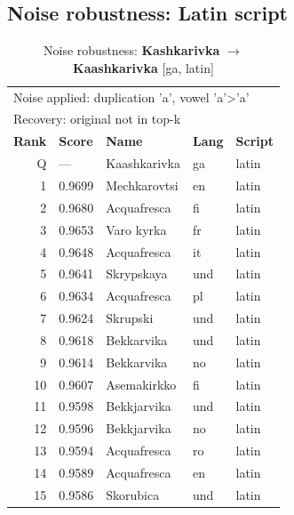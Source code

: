 


\subsection*{Noise robustness: Latin script}

\begin{table}[htbp]
\centering
\small
\caption{Noise robustness: \textbf{Kashkarivka} $\rightarrow$ \textbf{Kaashkarivka} [ga, latin]}
\label{tab:noise-1}
\begin{tabular}{rllll}
\toprule
\multicolumn{5}{l}{\small Noise applied: duplication 'a', vowel 'a'>'a'} \\
\multicolumn{5}{l}{\small Recovery: original not in top-k} \\
\midrule
\textbf{Rank} & \textbf{Score} & \textbf{Name} & \textbf{Lang} & \textbf{Script} \\
\midrule
\rowcolor{gray!20} Q & --- & Kaashkarivka & ga & latin \\
\midrule
1 & 0.9699 & Mechkarovtsi & en & latin \\
2 & 0.9680 & Acquafresca & fi & latin \\
3 & 0.9653 & Varo kyrka & fr & latin \\
4 & 0.9648 & Acquafresca & it & latin \\
5 & 0.9641 & Skrypskaya & und & latin \\
6 & 0.9634 & Acquafresca & pl & latin \\
7 & 0.9624 & Skrupski & und & latin \\
8 & 0.9618 & Bekkarvika & und & latin \\
9 & 0.9614 & Bekkarvika & no & latin \\
10 & 0.9607 & Asemakirkko & fi & latin \\
11 & 0.9598 & Bekkjarvika & und & latin \\
12 & 0.9596 & Bekkjarvika & no & latin \\
13 & 0.9594 & Acquafresca & ro & latin \\
14 & 0.9589 & Acquafresca & en & latin \\
15 & 0.9586 & Skorubica & und & latin \\
\bottomrule
\end{tabular}
\end{table}

